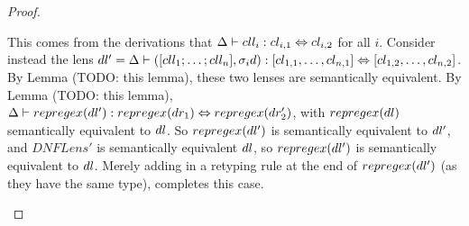 \begin{lemma}
\begin{proof}
\begin{enumerate}
This comes from the derivations that $\Delta \vdash cll_i : cl_{i,1} \Leftrightarrow cl_{i,2}$ for all $i$.
Consider instead the lens $dl' = \Delta \vdash ([cll_1 ; \ldots ; cll_n],\sigma_id) : [cl_{1,1}, \ldots, cl_{n,1}] \Leftrightarrow[cl_{1,2}, \ldots, cl_{n,2}]$.
By Lemma (TODO: this lemma), these two lenses are semantically equivalent.
By Lemma (TODO: this lemma), $\Delta \vdash repregex(dl') : repregex(dr_1) \Leftrightarrow repregex(dr_2')$, with $repregex(dl)$ semantically equivalent to $dl$.
So $repregex(dl')$ is semantically equivalent to $dl'$, and $DNFLens'$ is semantically equivalent $dl$, so $repregex(dl')$ is
semantically equivalent to $dl$.  Merely adding in a retyping rule at
the end of $repregex(dl')$ (as they have the same type), completes this case.
\end{enumerate}
\end{proof}
\end{lemma}

